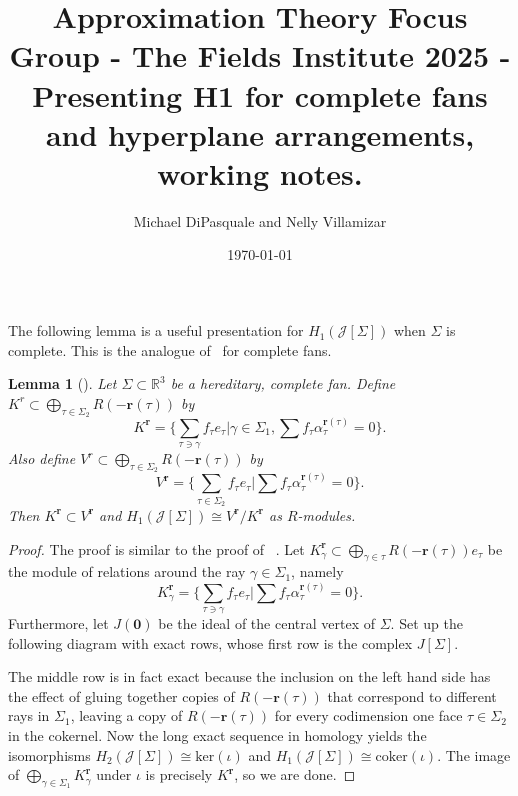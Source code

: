\documentclass[11pt, reqno]{amsart}
\title{Approximation Theory Focus Group - The Fields Institute 2025 - Presenting H1 for complete fans and hyperplane arrangements, working notes.}
\author{Michael DiPasquale and Nelly Villamizar}
\date{\today}
\newcommand{\R}{\mathbb{R}}
\newcommand{\br}{\mathbf{r}}
\newcommand{\calJ}{\mathcal{J}}
\newtheorem{lemma}[theorem]{Lemma}
\theoremstyle{definition}
\theoremstyle{remark}
\numberwithin{equation}{section}
\begin{document}
	
\maketitle

The following lemma is a useful presentation for $H_1(\calJ[\Sigma])$ when $\Sigma$ is complete. This is the analogue of~\cite[Lemma~3.8]{LCoho} for complete fans.

\begin{lemma}[{\cite[Lemma~9.12]{AssHom}}]\label{lem:H1Jpres}
	Let $\Sigma\subset\R^3$ be a hereditary, complete fan.  Define $K^r\subset \bigoplus\limits_{\tau\in\Sigma_2} R(-\br(\tau))$ by
	\[
	K^{\br}=\{\sum_{\tau\ni\gamma} f_\tau e_\tau|\gamma\in\Sigma_1, \sum f_\tau \alpha_\tau^{\br(\tau)}=0\}.
	\]
	Also define $V^r\subset \bigoplus\limits_{\tau\in\Sigma_2} R(-\br(\tau))$ by
	\[
	V^{\br}=\{\sum_{\tau\in\Sigma_2} f_\tau e_\tau| \sum f_\tau \alpha_\tau^{\br(\tau)}=0\}.
	\]
	Then $K^{\br}\subset V^{\br}$ and $H_1(\calJ[\Sigma])\cong V^{\br}/K^{\br}$ as $R$-modules.
\end{lemma}
\begin{proof}
	The proof is similar to the proof of ~\cite[Lemma~3.8]{LCoho}.  Let $K_\gamma^{\br}\subset \bigoplus_{\gamma\in\tau} R(-\br(\tau))e_\tau$ be the module of relations around the ray $\gamma\in\Sigma_1$, namely
	\[
	K^{\br}_\gamma=\{\sum_{\tau\ni\gamma} f_\tau e_\tau|\sum f_\tau\alpha_\tau^{\br(\tau)}=0\}.
	\]
	Furthermore, let $J(\mathbf{0})$ be the ideal of the central vertex of $\Sigma$.  Set up the following diagram with exact rows, whose first row is the complex $J[\Sigma]$.
	
	\begin{center}
	\end{center}
	
	
	The middle row is in fact exact because the inclusion on the left hand side has the effect of gluing together copies of $R(-\br(\tau))$ that correspond to different rays in $\Sigma_1$, leaving a copy of $R(-\br(\tau))$ for every codimension one face $\tau\in\Sigma_2$ in the cokernel.  Now the long exact sequence in homology yields the isomorphisms $H_2(\calJ[\Sigma])\cong \mbox{ker}(\iota)$ and $H_1(\calJ[\Sigma])\cong \mbox{coker}(\iota)$.  The image of $\bigoplus\limits_{\gamma\in\Sigma_1} K^{\br}_\gamma$ under $\iota$ is precisely $K^{\br}$, so we are done.
\end{proof}
\end{document}
